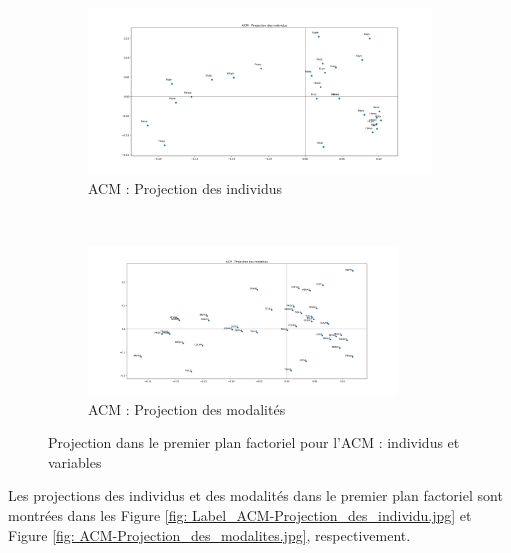     \begin{figure}[!htb]
        \begin{subfigure}[b]{1.0\textwidth}
            \centering
            \includegraphics[width=1.0\textwidth]{img/mixte_acm_cah/ACM-Projection_des_individus.jpg}
            \caption{ACM : Projection des individus}
            \label{Label_ACM-Projection_des_individu.jpg}
        \end{subfigure}
        \\
        \begin{subfigure}[b]{1.0\textwidth}
            \centering
            \includegraphics[width=0.9\textwidth]{img/mixte_acm_cah/ACM-Projection_des_modalites.jpg}
            \caption{ACM : Projection des modalités}
            \label{Label_ACM-Projection_des_modalites.jpg}
        \end{subfigure}
        \caption{Projection dans le premier plan factoriel pour l'ACM : individus et variables}
        \label{Label_ACM_Projection_Individus_Modalites.png}
    \end{figure}
    
Les projections des individus et des modalités dans le premier plan factoriel sont montrées dans les Figure \ref{fig: Label_ACM-Projection_des_individu.jpg} et Figure \ref{fig: ACM-Projection_des_modalites.jpg}, respectivement. 
    
